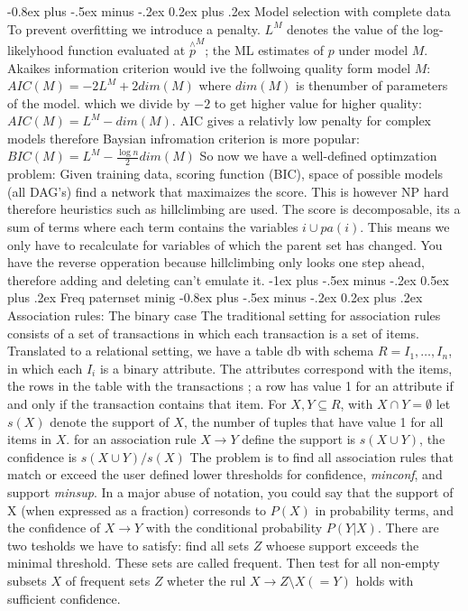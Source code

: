 \documentclass[8pt,landscape]{extarticle}
\makeatletter
\renewcommand{\section}{\@startsection{section}{1}{0mm}%
                                {-1ex plus -.5ex minus -.2ex}%
                                {0.5ex plus .2ex}%
                                {\normalfont\large\bfseries}}
\renewcommand{\subsection}{\@startsection{subsection}{2}{0mm}%
                                {-0.8ex plus -.5ex minus -.2ex}%
                                {0.2ex plus .2ex}%
                                {\normalfont\normalsize\bfseries}}
\makeatother
\begin{document}
\begin{multicols}{3}
\subsection{Model selection with complete data}
To prevent overfitting we introduce a penalty. $L^M$ denotes the value of the
log-likelyhood function evaluated at $\overset{\wedge}{p}^M$; the ML estimates
of $p$ under model $M$. Akaikes information criterion would ive the follwoing
quality form model $M$: $AIC(M)=-2L^M+2dim(M)$ where $dim(M)$ is thenumber of
parameters of the model. which we divide by $-2$ to get higher value for higher
quality: $AIC(M)=L^M-dim(M)$. AIC gives a relativly low penalty for complex
models therefore Baysian infromation criterion is more popular:
$BIC(M)=L^M-\frac{\log n}{2} dim(M)$
So now we have a well-defined optimzation problem: Given training data, scoring
function (BIC), space of possible models (all DAG's) find a network that
maximaizes the score.
This is however NP hard therefore heuristics such as hillclimbing are used.
The score is decomposable, its a sum of terms where each term contains the
variables $i \cup pa(i)$. This means we only have to recalculate for variables
of which the parent set has changed.
You have the reverse opperation because hillclimbing only looks one step ahead,
therefore adding and deleting can't emulate it.
\section{Freq paternset minig}
\subsection{Association rules: The binary case}
The traditional setting for association rules consists of a set of transactions
in which each transaction is a set of items.
Translated to a relational setting,
we have a table db with schema $R = {I_1 , \dots, I_n }$,
in which each $I_i$ is a binary attribute.
The attributes correspond with the items,
the rows in the table with the transactions
; a row has value 1 for an attribute if and only if the transaction contains
that item.
For $X,Y \subseteq R$, with $X\cap Y=\emptyset$ let $s(X)$ denote the support of
$X$, the number of tuples that have value 1 for all items in $X$. for an
association rule $X \to Y$ define the support is $s(X\cup Y)$, the confidence is
$s(X\cup Y)/s(X)$
The problem is to find all association rules that match or exceed the user
defined lower thresholds for confidence, \emph{minconf}, and support
\emph{minsup}.
In a major abuse of notation,
you could say that the support of X (when expressed as a fraction) corresonds
to $P (X)$ in probability terms,
and the confidence of $X \to Y$ with the conditional probability $P (Y | X)$.
There are two tesholds we have to satisfy:
find all sets $Z$ whoese support exceeds the minimal threshold. These sets are
called frequent. Then test for all non-empty subsets $X$ of frequent sets $Z$
wheter the rul $X \to Z \setminus X(=Y)$ holds with sufficient confidence.

\end{multicols}
\end{document}
